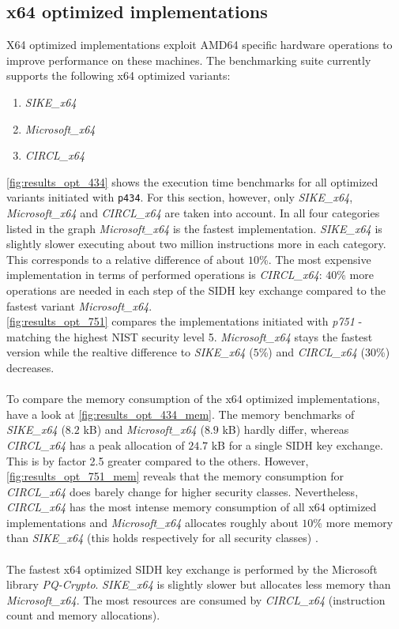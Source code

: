 \subsection{x64 optimized implementations}
X64 optimized implementations exploit AMD64 specific hardware operations to improve performance on these machines. The benchmarking suite currently supports the following x64 optimized variants:
\begin{enumerate}
\item \textit{SIKE\_x64}
\item \textit{Microsoft\_x64}
\item \textit{CIRCL\_x64}
\end{enumerate}
\autoref{fig:results_opt_434} shows the execution time benchmarks for all optimized variants initiated with \texttt{p434}. For this section, however, only \textit{SIKE\_x64}, \textit{Microsoft\_x64} and \textit{CIRCL\_x64} are taken into account. In all four categories listed in the graph \textit{Microsoft\_x64}  is the fastest implementation. \textit{SIKE\_x64} is slightly slower executing about two million instructions more in each category. This corresponds to a relative difference of about $10$\%. The most expensive implementation in terms of performed operations is \textit{CIRCL\_x64}: $40$\% more operations are needed in each step of the SIDH key exchange compared to the fastest variant \textit{Microsoft\_x64}.
\\
\autoref{fig:results_opt_751} compares the implementations initiated with \textit{p751} - matching the highest NIST security level 5. \textit{Microsoft\_x64} stays the fastest version while the realtive difference to \textit{SIKE\_x64} ($5$\%) and \textit{CIRCL\_x64} ($30$\%) decreases.
\\\\
To compare the memory consumption of the x64 optimized implementations, have a look at \autoref{fig:results_opt_434_mem}. The memory benchmarks of \textit{SIKE\_x64} ($8.2$ kB) and \textit{Microsoft\_x64} ($8.9$ kB) hardly differ, whereas \textit{CIRCL\_x64} has a peak allocation of $24.7$ kB for a single SIDH key exchange. This is by factor 2.5 greater compared to the others. However, \autoref{fig:results_opt_751_mem} reveals that the memory consumption for \textit{CIRCL\_x64} does barely change for higher security classes. Nevertheless,  \textit{CIRCL\_x64} has the most intense memory consumption of all x64 optimized implementations and \textit{Microsoft\_x64} allocates roughly about $10$\% more memory than \textit{SIKE\_x64} (this holds respectively for all security classes) .
\\\\
The fastest x64 optimized SIDH key exchange is performed by the Microsoft library \textit{PQ-Crypto}. \textit{SIKE\_x64} is slightly slower but allocates less memory than \textit{Microsoft\_x64}. The most resources are consumed by \textit{CIRCL\_x64} (instruction count and memory allocations).


